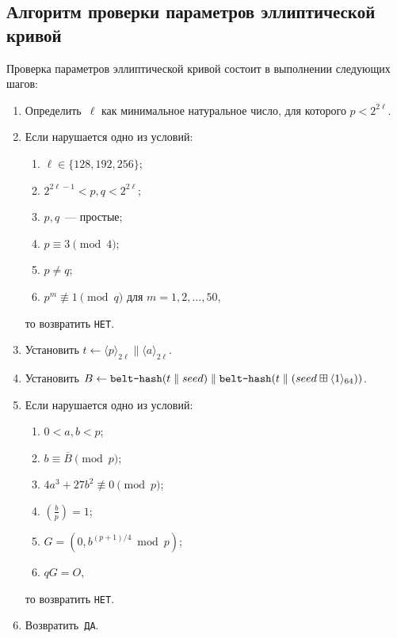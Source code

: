 \subsection{Алгоритм проверки параметров эллиптической кривой}\label{VALEC}

Проверка параметров эллиптической кривой состоит 
в выполнении следующих шагов:
\begin{enumerate}
\item
Определить~$\ell$ как минимальное натуральное число, 
для которого $p<2^{2\ell}$.
\item
Если нарушается одно из условий:
\begin{enumerate}
\item
$\ell\in\{128,192,256\}$;
\item
$2^{2\ell-1}<p,q<2^{2\ell}$;
\item
$p,q$~--- простые;
\item
$p\equiv 3\pmod{4}$;
\item
$p\neq q$;
\item
$p^m\not\equiv 1\pmod{q}$ для $m=1,2,\ldots,50$,
\end{enumerate}
то возвратить \texttt{НЕТ}.

\item
Установить
$t\leftarrow \langle p\rangle_{2\ell}\parallel \langle a\rangle_{2\ell}$.

\item
Установить
$B\leftarrow 
\texttt{belt-hash}(t\parallel seed)
\parallel
\texttt{belt-hash}(t\parallel(
seed\boxplus\langle 1\rangle_{64}))$.

\item
Если нарушается одно из условий:
\begin{enumerate}
\item
$0<a,b<p$;
\item
$b\equiv \overline{B}\pmod p$;
\item
$4a^3+27b^2\not\equiv 0\pmod{p}$;
\item
$\left(\frac{b}{p}\right)=1$;
\item
$G=(0,b^{(p+1)/4}\bmod p)$;
\item
$qG=O$,
\end{enumerate}
то возвратить \texttt{НЕТ}.
\item
Возвратить~\texttt{ДА}.
\end{enumerate}
